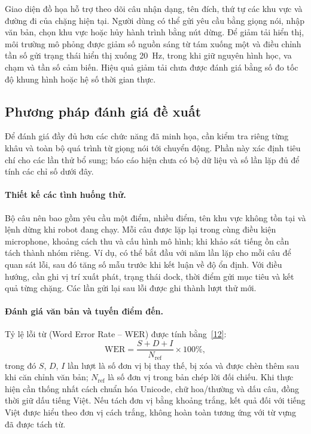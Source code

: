 \documentclass[13pt,a4paper]{extarticle}
\begin{document}
Giao diện đồ họa hỗ trợ theo dõi câu nhận dạng, tên đích, thứ tự các khu vực và đường đi của chặng hiện tại. Người dùng có thể gửi yêu cầu bằng giọng nói, nhập văn bản, chọn khu vực hoặc hủy hành trình bằng nút dừng. Để giảm tải hiển thị, môi trường mô phỏng được giảm số nguồn sáng từ tám xuống một và điều chỉnh tần số gửi trạng thái hiển thị xuống 20~Hz, trong khi giữ nguyên hình học, va chạm và tần số cảm biến. Hiệu quả giảm tải chưa được đánh giá bằng số đo tốc độ khung hình hoặc hệ số thời gian thực.

\subsection{Phương pháp đánh giá đề xuất}

Để đánh giá đầy đủ hơn các chức năng đã minh họa, cần kiểm tra riêng từng khâu và toàn bộ quá trình từ giọng nói tới chuyển động. Phần này xác định tiêu chí cho các lần thử bổ sung; báo cáo hiện chưa có bộ dữ liệu và số lần lặp đủ để tính các chỉ số dưới đây.

\paragraph{Thiết kế các tình huống thử.}
Bộ câu nên bao gồm yêu cầu một điểm, nhiều điểm, tên khu vực không tồn tại và lệnh dừng khi robot đang chạy. Mỗi câu được lặp lại trong cùng điều kiện microphone, khoảng cách thu và cấu hình mô hình; khi khảo sát tiếng ồn cần tách thành nhóm riêng. Ví dụ, có thể bắt đầu với năm lần lặp cho mỗi câu để quan sát lỗi, sau đó tăng số mẫu trước khi kết luận về độ ổn định. Với điều hướng, cần ghi vị trí xuất phát, trạng thái dock, thời điểm gửi mục tiêu và kết quả từng chặng. Các lần gửi lại sau lỗi được ghi thành lượt thử mới.

\paragraph{Đánh giá văn bản và tuyến điểm đến.}
Tỷ lệ lỗi từ (Word Error Rate -- WER) được tính bằng~\hyperref[ref:wer]{[12]}:
\begin{equation}
 \mathrm{WER}=\frac{S+D+I}{N_{\mathrm{ref}}}\times100\%,
\end{equation}
trong đó $S$, $D$, $I$ lần lượt là số đơn vị bị thay thế, bị xóa và được chèn thêm sau khi căn chỉnh văn bản; $N_{\mathrm{ref}}$ là số đơn vị trong bản chép lời đối chiếu. Khi thực hiện cần thống nhất cách chuẩn hóa Unicode, chữ hoa/thường và dấu câu, đồng thời giữ dấu tiếng Việt. Nếu tách đơn vị bằng khoảng trắng, kết quả đối với tiếng Việt được hiểu theo đơn vị cách trắng, không hoàn toàn tương ứng với từ vựng đã được tách từ.
\end{document}
